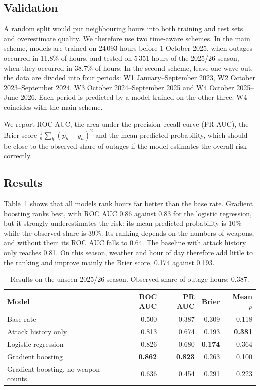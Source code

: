\documentclass[9pt,twocolumn,letterpaper]{extarticle}
\begin{document}
\subsection{Validation}
A random split would put neighbouring hours into both training and test sets and overestimate quality. We therefore use two time-aware schemes. In the main scheme, models are trained on 24\,093 hours before 1 October 2025, when outages occurred in 11.8\% of hours, and tested on 5\,351 hours of the 2025/26 season, when they occurred in 38.7\% of hours. In the second scheme, leave-one-wave-out, the data are divided into four periods: W1 January--September 2023, W2 October 2023--September 2024, W3 October 2024--September 2025 and W4 October 2025--June 2026. Each period is predicted by a model trained on the other three. W4 coincides with the main scheme.

We report ROC AUC, the area under the precision--recall curve (PR AUC), the Brier score $\frac{1}{n}\sum_h (p_h - y_h)^2$ and the mean predicted probability, which should be close to the observed share of outages if the model estimates the overall risk correctly.

\subsection{Results}
Table~\ref{tab:metrics} shows that all models rank hours far better than the base rate. Gradient boosting ranks best, with ROC AUC 0.86 against 0.83 for the logistic regression, but it strongly underestimates the risk: its mean predicted probability is 10\% while the observed share is 39\%. Its ranking depends on the numbers of weapons, and without them its ROC AUC falls to 0.64. The baseline with attack history only reaches 0.81. On this season, weather and hour of day therefore add little to the ranking and improve mainly the Brier score, 0.174 against 0.193.

\begin{table}[t]
\centering\small
\caption{Results on the unseen 2025/26 season. Observed share of outage hours: 0.387.}
\label{tab:metrics}
\begin{tabular}{@{}p{2.75cm}rrrr@{}}
\toprule
Model & ROC AUC & PR AUC & Brier & Mean $p$ \\
\midrule
Base rate & 0.500 & 0.387 & 0.309 & 0.118 \\
Attack history only & 0.813 & 0.674 & 0.193 & \textbf{0.381} \\
Logistic regression & 0.826 & 0.680 & \textbf{0.174} & 0.364 \\
Gradient boosting & \textbf{0.862} & \textbf{0.823} & 0.263 & 0.100 \\
Gradient boosting, no weapon counts & 0.636 & 0.454 & 0.291 & 0.223 \\
\bottomrule
\end{tabular}
\end{table}
\end{document}

